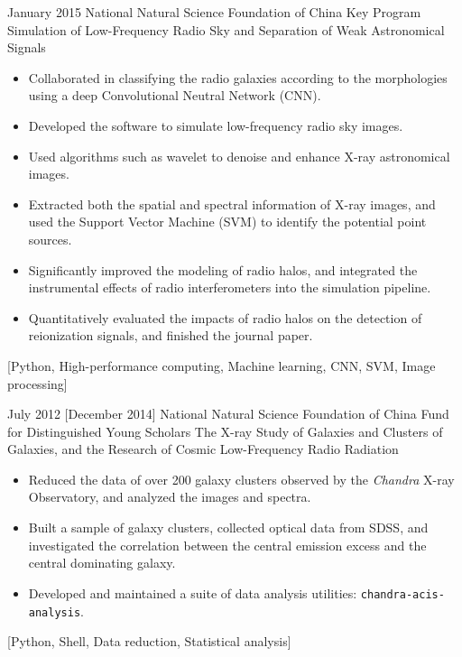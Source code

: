 \documentclass{resume}
\begin{document}
\begin{projects}
  \project
    {January 2015}%
    {National Natural Science Foundation of China}%
    {Key Program}%
    {Simulation of Low-Frequency Radio Sky and Separation of Weak
     Astronomical Signals}%
    {\begin{itemize}
      \item Collaborated in classifying the radio galaxies according to
        the morphologies using a deep Convolutional Neutral Network (CNN).
      \item Developed the
        software to simulate low-frequency radio sky images.
      \item Used algorithms such as wavelet to denoise and enhance X-ray
        astronomical images.
      \item Extracted both the spatial and spectral information of X-ray
        images, and used the Support Vector Machine (SVM) to identify the
        potential point sources.
      \item Significantly improved the modeling of radio halos,
        and integrated the instrumental effects of radio interferometers
        into the simulation pipeline.
      \item Quantitatively evaluated the impacts of radio halos on the
        detection of reionization signals, and finished the journal paper.
    \end{itemize}}%
    [Python, High-performance computing, Machine learning,
    CNN, SVM, Image processing]

  \separator{0.7em}
  \project
    {July 2012}%
    [December 2014]%
    {National Natural Science Foundation of China}%
    {Fund for Distinguished Young Scholars}%
    {The X-ray Study of Galaxies and Clusters of Galaxies,
      and the Research of Cosmic Low-Frequency Radio Radiation}%
    {\begin{itemize}
      \item Reduced the data of over 200 galaxy clusters observed by the
        \textit{Chandra} X-ray Observatory, and analyzed the images and
        spectra.
      \item Built a sample of galaxy clusters, collected optical data from
        SDSS, and investigated the correlation between the central emission
        excess and the central dominating galaxy.
      \item Developed and maintained a suite of data analysis utilities:
          {\texttt{chandra-acis-analysis}}.
    \end{itemize}}%
    [Python, Shell, Data reduction, Statistical analysis]
\end{projects}
\end{document}
